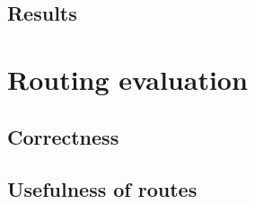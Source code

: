 	\subsection{Results}
	
\section{Routing evaluation}

	\subsection{Correctness}
	

	\subsection{Usefulness of routes}
	
